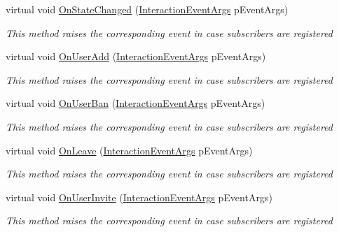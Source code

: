 \begin{DoxyCompactItemize}
virtual void \hyperlink{class_plex_byte_1_1_mo_cap_1_1_interactions_1_1_project_ad08e79e01889284723d1dda27a3fb9c8}{On\+State\+Changed} (\hyperlink{class_plex_byte_1_1_mo_cap_1_1_interactions_1_1_interaction_event_args}{Interaction\+Event\+Args} p\+Event\+Args)
\begin{DoxyCompactList}\small\item\em This method raises the corresponding event in case subscribers are registered \end{DoxyCompactList}\item 
virtual void \hyperlink{class_plex_byte_1_1_mo_cap_1_1_interactions_1_1_project_a0c145698f05dc44311f8a9f819a4d57a}{On\+User\+Add} (\hyperlink{class_plex_byte_1_1_mo_cap_1_1_interactions_1_1_interaction_event_args}{Interaction\+Event\+Args} p\+Event\+Args)
\begin{DoxyCompactList}\small\item\em This method raises the corresponding event in case subscribers are registered \end{DoxyCompactList}\item 
virtual void \hyperlink{class_plex_byte_1_1_mo_cap_1_1_interactions_1_1_project_ac55a17f8dec4f7319f08c8e05a28ae81}{On\+User\+Ban} (\hyperlink{class_plex_byte_1_1_mo_cap_1_1_interactions_1_1_interaction_event_args}{Interaction\+Event\+Args} p\+Event\+Args)
\begin{DoxyCompactList}\small\item\em This method raises the corresponding event in case subscribers are registered \end{DoxyCompactList}\item 
virtual void \hyperlink{class_plex_byte_1_1_mo_cap_1_1_interactions_1_1_project_ac6cbff0fad9543c37a22e52ad23d7ebd}{On\+Leave} (\hyperlink{class_plex_byte_1_1_mo_cap_1_1_interactions_1_1_interaction_event_args}{Interaction\+Event\+Args} p\+Event\+Args)
\begin{DoxyCompactList}\small\item\em This method raises the corresponding event in case subscribers are registered \end{DoxyCompactList}\item 
virtual void \hyperlink{class_plex_byte_1_1_mo_cap_1_1_interactions_1_1_project_a62c49cc0097eefd5ba3c070585a9a5a4}{On\+User\+Invite} (\hyperlink{class_plex_byte_1_1_mo_cap_1_1_interactions_1_1_interaction_event_args}{Interaction\+Event\+Args} p\+Event\+Args)
\begin{DoxyCompactList}\small\item\em This method raises the corresponding event in case subscribers are registered \end{DoxyCompactList}\item 

\end{DoxyCompactItemize}
